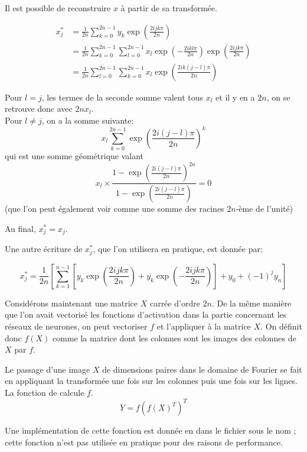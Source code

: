 Il est possible de reconstruire $x$ à partir de sa transformée.

\begin{align*}
x^{*}_j &= \frac{1}{2n} \sum_{k=0}^{2n-1} y_k \exp\left( \frac{2ijk\pi}{2n} \right)  \\
        &= \frac{1}{2n} \sum_{k=0}^{2n-1} \sum_{l = 0}^{2n-1} x_l \exp\left(-\frac{2ikl\pi}{2n}\right) \exp\left( \frac{2ijk\pi}{2n} \right) \\
		&= \frac{1}{2n} \sum_{l=0}^{2n-1} \sum_{k = 0}^{2n-1} x_l \exp\left(\frac{2ik(j-l)\pi}{2n}\right) 
\end{align*}

Pour $l = j$, les termes de la seconde somme valent tous $x_l$ et il y en a 
$2n$, on se retrouve donc avec $2n x_l$. \\
Pour $l \neq j$, on a la somme suivante:
\[
x_l \sum_{k = 0}^{2n-1} \exp\left(\frac{2i(j-l)\pi}{2n}\right)^k 
\]
qui est une somme géométrique valant
\[
x_l \times \frac{1-\exp\left(\frac{2i(j-l)\pi}{2n}\right)^{2n}}{1-\exp\left(\frac{2i(j-l)\pi}{2n}\right)} = 0
\]
(que l'on peut également voir comme une somme des racines $2n$-ème de l'unité)

Au final, $x^{*}_j = x_j$.

Une autre écriture de $x^{*}_j$, que l'on utilisera en pratique, est donnée par:

\[
x^{*}_j = \frac{1}{2n} \left[ \sum_{k=1}^{n-1} \left[ y_k \exp\left( \frac{2ijk\pi}{2n} \right) 
          + \overline{y_k} \exp\left(-\frac{2ijk\pi}{2n} \right) \right]
		  + y_0 + (-1)^{j} y_n \right]
\]


Considérons maintenant une matrice $X$ carrée d'ordre $2n$. 
De la même manière que l'on avait vectorisé les fonctions 
d'activation dans la partie concernant les réseaux de neurones, 
on peut vectoriser $f$ et l'appliquer à la matrice $X$. 
On définit donc $f(X)$ comme la matrice dont les colonnes sont 
les images des colonnes de $X$ par $f$.

Le passage d'une image $X$ de dimensions paires dans le domaine 
de Fourier se fait en appliquant la transformée une fois sur les 
colonnes puis une fois sur les lignes. 
La fonction  de  calcule $f$.
\[
Y = f(f(X)^T)^T
\]

Une implémentation de cette fonction est donnée en \Python dans le 
fichier  sous le nom ; cette 
fonction n'est pas utilisée en pratique pour des raisons de performance.




